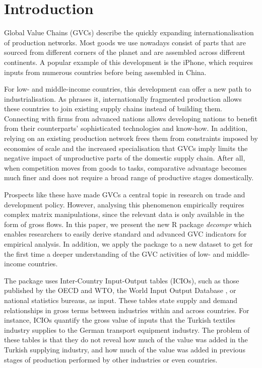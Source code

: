 \documentclass[a4paper,11pt]{article}
\begin{document}
\cleardoublepage

\section{Introduction}
Global Value Chains (GVCs) describe the quickly expanding internationalisation of production networks. Most goods we use nowadays consist of parts that are sourced from different corners of the planet and are assembled across different continents. A popular example of this development is the iPhone, which requires inputs from numerous countries before being assembled in China. 

For low- and middle-income countries, this development can offer a new path to industrialisation. As \citet{riba12} phrases it, internationally fragmented production allows these countries to join existing supply chains instead of building them. Connecting with firms from advanced nations allows developing nations to benefit from their counterparts' sophisticated technologies and know-how. In addition, relying on an existing production network frees them from constraints imposed by economies of scale and the increased specialisation that GVCs imply limits the negative impact of unproductive parts of the domestic supply chain. After all, when competition moves from goods to tasks, comparative advantage becomes much finer and does not require a broad range of productive stages domestically.

Prospects like these have made GVCs a central topic in research on trade and development policy. However, analysing this phenomenon empirically requires complex matrix manipulations, since the relevant data is only available in the form of gross flows. In this paper, we present the new R package \textit{decompr} which enables researchers to easily derive standard and advanced GVC indicators for empirical analysis. In addition, we apply the package to a new dataset to get for the first time a deeper understanding of the GVC activities of low- and middle-income countries.

The package uses Inter-Country Input-Output tables (ICIOs), such as those published by the OECD and WTO, the World Input Output Database \citep{mati12},  or national statistics bureaus, as input. These tables state supply and demand relationships in gross terms between industries within and across countries. For instance, ICIOs quantify the gross value of inputs that the Turkish textiles industry supplies to the German transport equipment industry. The problem of these tables is that they do not reveal how much of the value was added in the Turkish supplying industry, and how much of the value was added in previous stages of production performed by other industries or even countries.
\end{document}
